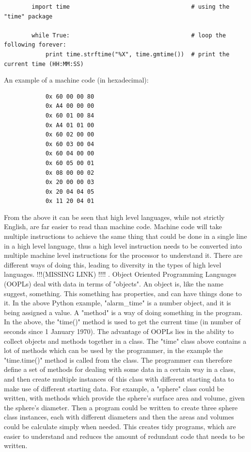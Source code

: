 \documentclass[twoside,a4]{report}
\def\br{\newline \newline \noindent}
\def\hi{\huge{!!!}}
\def\nohi{!!!! \normalsize}
\begin{document}
\begin{verbatim}
        import time                                   # using the "time" package
        
        while True:                                   # loop the following forever:
            print time.strftime("%X", time.gmtime())  # print the current time (HH:MM:SS)
\end{verbatim}
An example of a machine code (in hexadecimal)\cite{proglangmachex}:
\begin{verbatim}
            0x 60 00 00 80
            0x A4 00 00 00
            0x 60 01 00 84
            0x A4 01 01 00
            0x 60 02 00 00
            0x 60 03 00 04
            0x 60 04 00 00
            0x 60 05 00 01
            0x 08 00 00 02
            0x 20 00 00 03
            0x 20 04 04 05
            0x 11 20 04 01
\end{verbatim}
From the above it can be seen that high level languages, while not strictly English, are far easier to read than machine code. Machine code will take multiple instructions to achieve the same thing that could be done in a single line in a high level language, thus a high level instruction needs to be converted into multiple machine level instructions for the processor to understand it. There are different ways of doing this, leading to diversity in the types of high level languages. \hi (MISSING LINK) \nohi. Object Oriented Programming Languages (OOPLs) deal with data in terms of "objects"\cite{proglangwhatisoopl}. An object is, like the name suggest, something. This something has properties, and can have things done to it. In the above Python example, "alarm\_time" is a number object, and it is being assigned a value. A "method" is a way of doing something in the program. In the above, the "time()" method is used to get the current time (in number of seconds since 1 January 1970). The advantage of OOPLs lies in the ability to collect objects and methods together in a class. The "time" class above contains a lot of methods which can be used by the programmer, in the example the "time.time()" method is called from the class. The programmer can therefore define a set of methods for dealing with some data in a certain way in a class, and then create multiple instances of this class with different starting data to make use of different starting data. For example, a "sphere" class could be written, with methods which provide the sphere's surface area and volume, given the sphere's diameter. Then a program could be written to create three sphere class instances, each with different diameters and then the areas and volumes could be calculate simply when needed. This creates tidy programs, which are easier to understand and reduces the amount of redundant code that needs to be written. \br
\end{document}
